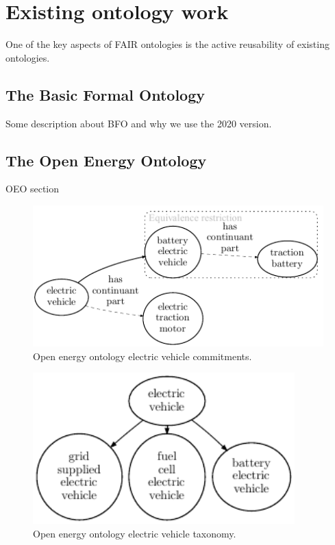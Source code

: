 
\section{Existing ontology work}
\label{existingontologies}

One of the key aspects of FAIR ontologies is the active reusability of existing
ontologies.

\subsection{The Basic Formal Ontology}

Some description about BFO and why we use the 2020 version.

\subsection{The Open Energy Ontology}

OEO section

\begin{figure}[h]
    \caption{Open energy ontology electric vehicle commitments.}
    \centering
    \includegraphics[width=1.0\textwidth]{images/OEOEV}
\end{figure}

\begin{figure}[h]
    \caption{Open energy ontology electric vehicle taxonomy.}
    \centering
    \includegraphics[width=0.9\textwidth]{images/OEOVehicles}
\end{figure}

